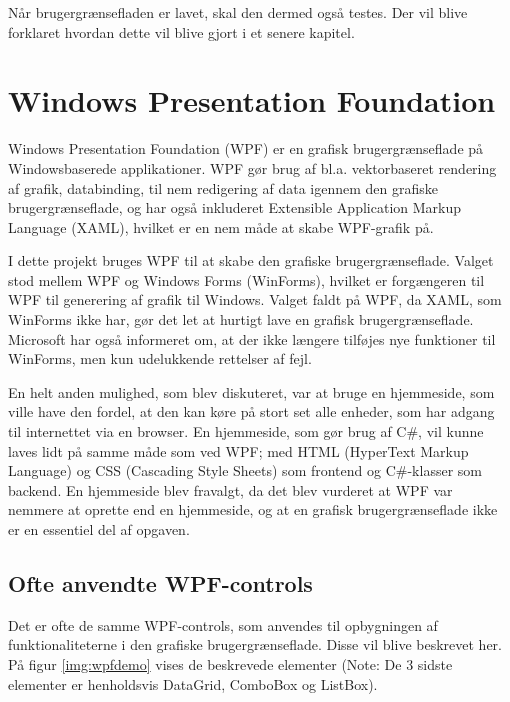 
Når brugergrænsefladen er lavet, skal den dermed også testes. Der vil blive forklaret hvordan dette vil blive gjort i et senere kapitel. 

\section{Windows Presentation Foundation}

\cbstart

Windows Presentation Foundation (WPF) er en grafisk brugergrænseflade på Windowsbaserede applikationer. 
WPF gør brug af  bl.a. vektorbaseret rendering af grafik, databinding, til nem redigering af data igennem den grafiske brugergrænseflade, og har også inkluderet Extensible Application Markup Language (XAML), hvilket er en nem måde at skabe WPF-grafik på.\citep{wpf} 

I dette projekt bruges WPF til at skabe den grafiske brugergrænseflade. Valget stod mellem WPF og Windows Forms (WinForms), hvilket er forgængeren til WPF til generering af grafik til Windows. 
Valget faldt på WPF, da XAML, som WinForms ikke har, gør det let at hurtigt lave en grafisk brugergrænseflade. 
Microsoft har også informeret om, at der ikke længere tilføjes nye funktioner til WinForms, men kun udelukkende rettelser af fejl.\citep{winforms}

En helt anden mulighed, som blev diskuteret, var at bruge en hjemmeside, som ville have den fordel, at den kan køre på stort set alle enheder, som har adgang til internettet via en browser. En hjemmeside, som gør brug af C\#, vil kunne laves lidt på samme måde som ved WPF; med HTML (HyperText Markup Language) og CSS (Cascading Style Sheets) som frontend og C\#-klasser som backend. 
En hjemmeside blev fravalgt, da det blev vurderet at WPF var nemmere at oprette end en hjemmeside, og at en grafisk brugergrænseflade ikke er en essentiel del af opgaven. 

\subsection{Ofte anvendte WPF-controls}
Det er ofte de samme WPF-controls, som anvendes til opbygningen af funktionaliteterne i den grafiske brugergrænseflade.
Disse vil blive beskrevet her.
På figur \ref{img:wpfdemo} vises de beskrevede elementer (Note: De 3 sidste elementer er henholdsvis DataGrid, ComboBox og ListBox).

